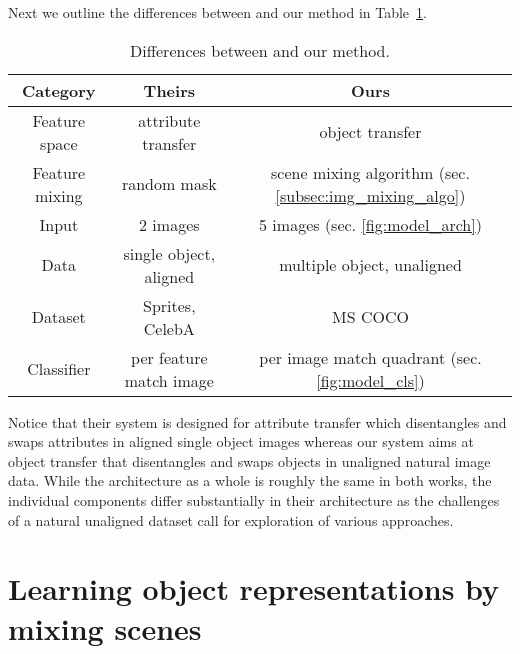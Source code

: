 \documentclass[12pt,a4paper]{article}
\begin{document}
Next we outline the differences between \cite{DisentFacOfVarByMixTh} and our method in Table~\ref{tab:diffHuVsLorbms}.
\begin{table} [H]
\centering
\begin{tabular}{|c|c|c|}
\hline
\textbf{Category} & \textbf{Theirs} & \textbf{Ours}\\
\hline
Feature space & attribute transfer & object transfer\\
\hline
Feature mixing & random mask & scene mixing algorithm (sec. \ref{subsec:img_mixing_algo}) \\
\hline
Input  & 2 images & 5 images (sec. \ref{fig:model_arch}) \\
\hline
Data & single object, aligned & multiple object, unaligned\\
\hline
Dataset & Sprites, CelebA & MS COCO \\
\hline
Classifier & per feature match image & per image match quadrant (sec. \ref{fig:model_cls}) \\
\hline
\end{tabular}
\caption{Differences between \cite{DisentFacOfVarByMixTh} and our method.} \label{tab:diffHuVsLorbms}
\end{table}
Notice that their system is designed for attribute transfer which disentangles and swaps attributes in aligned single object images whereas our system aims at object transfer that disentangles and swaps objects in unaligned natural image data. While the architecture as a whole is roughly the same in both works, the individual components differ substantially in their architecture as the challenges of a natural unaligned dataset call for exploration of various approaches.
 

%
\section{Learning object representations by mixing scenes}
\end{document}
